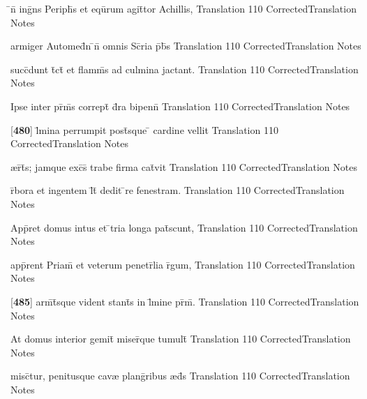 \latline
  {\={}n\={} ing\={}ns Periph\={}s et equ\={}rum agit\={}tor Achillis,}
  { Translation }
  {110}
  { CorrectedTranslation }
  { Notes }


\latline
  {armiger Automed\={}n \={}n\={} omnis Sc\={}ria p\={}b\={}s}
  { Translation }
  {110}
  { CorrectedTranslation }
  { Notes }


\latline
  {succ\={}dunt t\={}ct\={} et flamm\={}s ad culmina jactant.}
  { Translation }
  {110}
  { CorrectedTranslation }
  { Notes }


\latline
  {Ipse inter pr\={\macron {\i}}m\={}s corrept\={} d\={}ra bipenn\={\macron {\i}}}
  { Translation }
  {110}
  { CorrectedTranslation }
  { Notes }


\latline
  {[\textbf{480}] l\={\macron {\i}}mina perrumpit post\={\macron {\i}}sque \={} cardine vellit}
  { Translation }
  {110}
  { CorrectedTranslation }
  { Notes }


\latline
  {{\ae}r\={}t\={}s; jamque exc\={\macron {\i}}s\={} trabe firma cat\={}vit}
  { Translation }
  {110}
  { CorrectedTranslation }
  { Notes }


\latline
  {r\={}bora et ingentem l\={}t\={} dedit \={}re fenestram.}
  { Translation }
  {110}
  { CorrectedTranslation }
  { Notes }


\latline
  {App\={}ret domus intus et \={}tria longa pat\={}scunt,}
  { Translation }
  {110}
  { CorrectedTranslation }
  { Notes }


\latline
  {app\={}rent Priam\={\macron {\i}} et veterum penetr\={}lia r\={}gum,}
  { Translation }
  {110}
  { CorrectedTranslation }
  { Notes }


\latline
  {[\textbf{485}] arm\={}t\={}sque vident stant\={\macron {\i}}s in l\={\macron {\i}}mine pr\={\macron {\i}}m\={}.}
  { Translation }
  {110}
  { CorrectedTranslation }
  { Notes }


\latline
  {At domus interior gemit\={} miser\={}que tumult\={}}
  { Translation }
  {110}
  { CorrectedTranslation }
  { Notes }


\latline
  {misc\={}tur, penitusque cav{\ae} plang\={}ribus {\ae}d\={}s}
  { Translation }
  {110}
  { CorrectedTranslation }
  { Notes }


